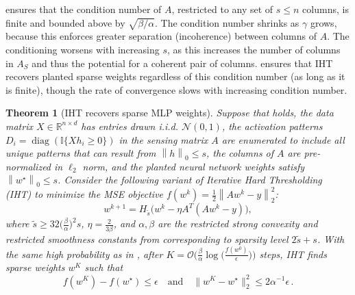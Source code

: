 \documentclass{article} %
\newcommand{\zeronorm}[1]{\left\|#1\right\|_{0}}
\newcommand{\twonorm}[1]{\left\|#1\right\|_{2}}
\newcommand{\measurement}{y}
\newcommand{\n}{\ensuremath{n}}
\newcommand{\datadim}{\ensuremath{d}}
\newcommand{\X}{\ensuremath{X}}
\newcommand{\w}{\ensuremath{w}}
\newcommand{\h}{\ensuremath{h}}
\newtheorem{theorem}{Theorem}
\DeclareMathOperator{\diag}{diag}
\newcommand{\1}{\ensuremath{{\sf (i)}}}
\newcommand{\2}{\ensuremath{{\sf (ii)}}}
\newcommand{\3}{\ensuremath{{\sf (iii)}}}
\newcommand{\4}{\ensuremath{{\sf (iv)}}}
\newcommand{\5}{\ensuremath{{\sf (v)}}}
\newcommand{\6}{\ensuremath{{\sf (vi)}}}
\newcommand{\R}{\mathbb{R}}
\begin{document}
 ensures that the condition number of $A$, restricted to any set of $s\leq n$ columns, is finite and bounded above by $\sqrt{\beta/\alpha}$. The condition number shrinks as $\gamma$ grows, because this enforces greater separation (incoherence) between columns of $A$. The conditioning worsens with increasing $s$, as this increases the number of columns in $A_S$ and thus the potential for a coherent pair of columns.
 ensures that IHT recovers planted sparse weights regardless of this condition number (as long as it is finite), though the rate of convergence slows with increasing condition number.






\begin{theorem}[IHT recovers sparse MLP weights] \label{thm:ihtrecovers_s_inflation}
    Suppose that  holds, the data matrix $\X \in \R^{\n \times \datadim}$ has entries drawn i.i.d. $\mathcal{N}(0,1)$, the activation patterns $D_i = \diag{(\mathbb{I}\{\X\h_i \geq 0\})}$ in the sensing matrix $A$ are enumerated to include all unique patterns that can result from $\zeronorm{\h} \leq s$, the columns of $A$ are pre-normalized in $\ell_2$ norm, and the planted neural network weights satisfy $\zeronorm{\w^\star} \leq s$.
    Consider the following variant of Iterative Hard Thresholding (IHT) to minimize the MSE objective $f(\w^k) = \frac{1}{2}\twonorm{A\w^k - \measurement}^2$:
    \begin{equation}
    \w^{k+1} = H_{\tilde s}\big(\w^k - \eta A^T(A\w^k - \measurement)\big) ,
    \end{equation}
    where $\tilde s \geq 32\big(\frac{\beta}{\alpha}\big)^2s$, $\eta = \frac{2}{3\beta}$, and $\alpha, \beta$ are the restricted strong convexity and restricted smoothness constants from  corresponding to sparsity level $2\tilde s + s$. With the same high probability as in , after $K = \mathcal{O}\big(\frac{\beta}{\alpha}\log\big(\frac{f(\w^0)}{\epsilon}\big)\big)$ steps, IHT finds sparse weights $\w^K$ such that
    \begin{equation*}
        f(\w^K) - f(\w^\star) \leq \epsilon \quad \mbox{and} \quad \|\w^K - \w^\star\|_2^2\le 2\alpha^{-1} \epsilon\,.
    \end{equation*}
\end{theorem}
\end{document}

